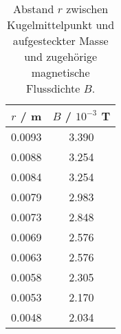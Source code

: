 \begin{table}[!htp]
\centering
\caption{Abstand $r$ zwischen Kugelmittelpunkt und aufgesteckter Masse und zugehörige magnetische Flussdichte $B$.}
\label{tab:gravi2}
\begin{tabular}{c c}
\toprule
{$r$ / m} & {$B$ / $10^{-3}$ T} \\
\midrule
0.0093 & 3.390 \\
0.0088 & 3.254 \\
0.0084 & 3.254 \\
0.0079 & 2.983 \\
0.0073 & 2.848 \\
0.0069 & 2.576 \\
0.0063 & 2.576 \\
0.0058 & 2.305 \\
0.0053 & 2.170 \\
0.0048 & 2.034 \\
\bottomrule
\end{tabular}
\end{table}